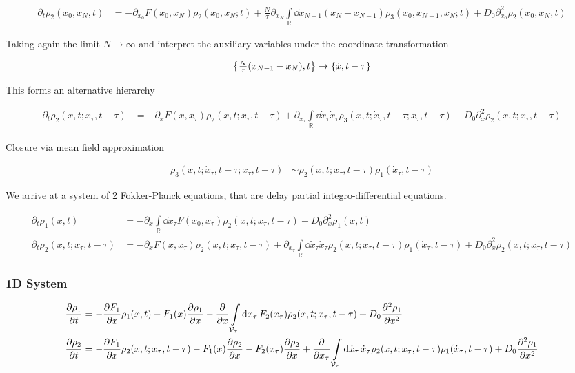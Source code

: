 \documentclass[a4paper,10pt]{article}
\newcommand{\intl}{\int\limits}
\begin{document}
\begin{align}
	\partial_t
	\rho_2(x_0,x_N,t)
	&=
	-
	\partial_{x_0}
	F(x_0,x_N)
	\rho_{2}(x_0,x_N;t)
	+
	\frac{N}{\tau}
	\partial_{x_N}
	\intl_\mathbb{R}
	\dd{x_{N-1}}
	(x_N-x_{N-1})
	\rho_{3}(x_0,x_{N-1},x_N;t)
	+
	D_0
	\partial_{x_0}^2
	\rho_2(x_0,x_N,t)
\end{align}

Taking again the limit $N\to\infty$ and interpret the auxiliary variables under the coordinate transformation

\begin{align}
	\Bqty{\tfrac{N}{\tau}(x_{N-1}-x_N),t}
	\to
	\Bqty{\dot{x},t-\tau}
\end{align}

This forms an alternative hierarchy

\begin{align}
	\partial_t
	\rho_2(x,t;x_\tau,t-\tau)
	&=
	-
	\partial_{x}
	F(x,x_\tau)
	\rho_2(x,t;x_\tau,t-\tau)
	+
	\partial_{x_\tau}
	\intl_\mathbb{R}
	\dd{\dot{x}_\tau}
	\dot{x}_\tau
	\rho_{3}(x,t;\dot{x}_\tau,t-\tau;x_\tau,t-\tau)
	+
	D_0
	\partial_{x}^2
	\rho_2(x,t;x_\tau,t-\tau)
\end{align}

Closure via mean field approximation

\begin{align}
	\rho_{3}(x,t;\dot{x}_\tau,t-\tau;x_\tau,t-\tau)
	&\sim
	\rho_2(x,t;x_\tau,t-\tau)
	\rho_1(\dot{x}_\tau,t-\tau)
\end{align}

We arrive at a system of 2 Fokker-Planck equations, that are delay partial integro-differential equations. 

\begin{align}
	\partial_t
	\rho_1(x,t)
	&=
	-
	\partial_{x}
	\intl_\mathbb{R}
	\dd{x_\tau}
	F(x_0,x_\tau)
	\rho_2(x,t;x_\tau,t-\tau)
	+
	D_0
	\partial_{x}^2
	\rho_1(x,t)
\\
	\partial_t
	\rho_2(x,t;x_\tau,t-\tau)
	&=
	-
	\partial_{x}
	F(x,x_\tau)
	\rho_2(x,t;x_\tau,t-\tau)
	+
	\partial_{x_\tau}
	\intl_\mathbb{R}
	\dd{\dot{x}_\tau}
	\dot{x}_\tau
	\rho_2(x,t;x_\tau,t-\tau)
	\rho_1(\dot{x}_\tau,t-\tau)
	+
	D_0
	\partial_{x}^2
	\rho_2(x,t;x_\tau,t-\tau)
\end{align}


\subsubsection*{1D System}

\begin{align}
	\pdv{\rho_1}{t}
	&=
	- 
	\pdv{F_1}{x}
	\rho_1
	(x,t)
	-
	F_1(x)
	\pdv{\rho_1}{x}
	-
	\pdv{x}
	\intl_{\mathcal{V}_\tau}
	\dd{x_\tau}
	F_2(x_\tau)
	\rho_2
	(x,t;x_\tau,t-\tau)	
	+
	D_0
	\pdv[2]{\rho_1}{x}
\\
	\pdv{\rho_2}{t}
	&=
	- 
	\pdv{F_1}{x}
	\rho_2
	(x,t;x_\tau,t-\tau)
	-
	F_1(x)
	\pdv{\rho_2}{x}
	-
	F_2(x_\tau)
	\pdv{\rho_2}{x}
	+
	\pdv{x_\tau}
	\intl_{\mathcal{V}_\tau}
	\dd{\dot{x}_\tau}
	\dot{x}_\tau
	\rho_2
	(x,t;x_\tau,t-\tau)	
	\rho_1
	(\dot{x}_\tau,t-\tau)	
	+
	D_0
	\pdv[2]{\rho_1}{x}
\end{align}
\end{document}
